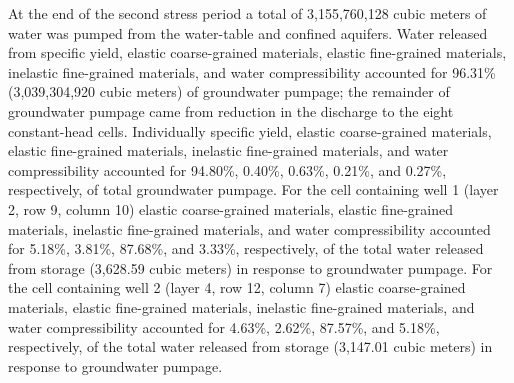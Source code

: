 At the end of the second stress period a total of 3,155,760,128 cubic meters of water was pumped from the water-table and confined aquifers. Water released from specific yield, elastic coarse-grained materials, elastic fine-grained materials, inelastic fine-grained materials, and water compressibility accounted for 96.31\% (3,039,304,920 cubic meters) of groundwater pumpage; the remainder of groundwater pumpage came from reduction in the discharge to the eight constant-head cells. Individually specific yield, elastic coarse-grained materials, elastic fine-grained materials, inelastic fine-grained materials, and water compressibility accounted for 94.80\%, 0.40\%, 0.63\%, 0.21\%, and 0.27\%, respectively, of total groundwater pumpage. For the cell containing well 1 (layer 2, row 9, column 10) elastic coarse-grained materials, elastic fine-grained materials, inelastic fine-grained materials, and water compressibility accounted for 5.18\%, 3.81\%, 87.68\%, and 3.33\%, respectively, of the total water released from storage (3,628.59 cubic meters) in response to groundwater pumpage. For the cell containing well 2 (layer 4, row 12, column 7) elastic coarse-grained materials, elastic fine-grained materials, inelastic fine-grained materials, and water compressibility accounted for 4.63\%, 2.62\%, 87.57\%, and 5.18\%, respectively, of the total water released from storage (3,147.01 cubic meters) in response to groundwater pumpage.
    



